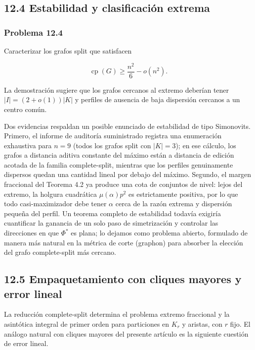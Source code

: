 \documentclass[spanish,11pt,a4paper]{article}
\begin{document}
\subsection{12.4 Estabilidad y clasificación
extrema}\label{estabilidad-y-clasificaciuxf3n-extrema}

\subsubsection{Problema 12.4}\label{problema-12.4}

Caracterizar los grafos split que satisfacen

\[
\operatorname{cp}(G)
\ge
\frac{n^2}{6}-o(n^2).
\]

La demostración sugiere que los grafos cercanos al extremo deberían
tener \(|I|=(2+o(1))|K|\) y perfiles de ausencia de baja dispersión
cercanos a un centro común.

Dos evidencias respaldan un posible enunciado de estabilidad de tipo
Simonovits. Primero, el informe de auditoría suministrado registra una
enumeración exhaustiva para \(n=9\) (todos los grafos split con
\(|K|=3\)); en ese cálculo, los grafos a distancia aditiva constante del
máximo están a distancia de edición acotada de la familia
complete-split, mientras que los perfiles genuinamente dispersos quedan
una cantidad lineal por debajo del máximo. Segundo, el margen fraccional
del Teorema 4.2 ya produce una cota de conjuntos de nivel: lejos del
extremo, la holgura cuadrática \(\mu(\alpha)p^2\) es estrictamente
positiva, por lo que todo casi-maximizador debe tener \(\alpha\) cerca
de la razón extrema y dispersión pequeña del perfil. Un teorema completo
de estabilidad todavía exigiría cuantificar la ganancia de un solo paso
de simetrización y controlar las direcciones en que \(\Phi^*\) es plana;
lo dejamos como problema abierto, formulado de manera más natural en la
métrica de corte (graphon) para absorber la elección del grafo
complete-split más cercano.

\subsection{12.5 Empaquetamiento con cliques mayores y error
lineal}\label{empaquetamiento-con-cliques-mayores-y-error-lineal}

La reducción complete-split determina el problema extremo fraccional y
la asintótica integral de primer orden para particiones en \(K_r\) y
aristas, con \(r\) fijo. El análogo natural con cliques mayores del
presente artículo es la siguiente cuestión de error lineal.
\end{document}
